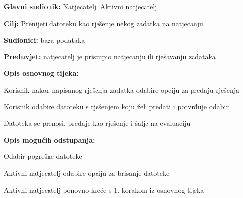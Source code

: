 					\noindent {}
					\begin{packed_item}
						
						\item \textbf{Glavni sudionik: }Natjecatelj, Aktivni natjecatelj
						\item \textbf{Cilj:} Prenijeti datoteku kao rješenje nekog zadatka na natjecanju
						\item \textbf{Sudionici:} baza podataka
						\item \textbf{Preduvjet:} natjecatelj je pristupio natjecanju ili rješavanju zadataka
						\item \textbf{Opis osnovnog tijeka:}
						
						\item[] \begin{packed_enum}
							\item Korisnik nakon napisanog rješenja zadatka odabire opciju za predaju rješenja
							\item Korisnik odabire datoteku s rješenjem koju želi predati i potvrđuje odabir
							\item Datoteka se prenosi, predaje kao rješenje i šalje na evaluaciju
						\end{packed_enum}
						
							\item  \textbf{Opis mogućih odstupanja:}
							
							\item[] \begin{packed_item}
								
								\item[2.a] Odabir pogrešne datoteke
								\item[] \begin{packed_enum}
									
									\item Aktivni natjecatelj odabire opciju za brisanje datoteke 
									\item Aktivni natjecatelj ponovno kreće s 1. korakom iz osnovnog tijeka
																
								\end{packed_enum}
							\end{packed_item}
						\end{packed_item}
									
									
					
